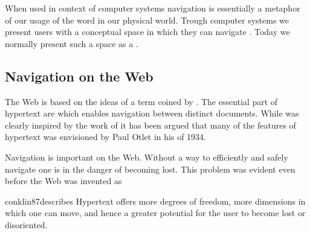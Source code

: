 When used in context of
computer systems navigation is essentially a metaphor of our usage of the
word in our physical world. Trough computer systems we present users with a
conceptual space in which they can navigate \citep[]{whiteside85}.
Today we normally present such a space as a %
.

\subsection{Navigation on the Web}
\label{section:background.navigation.navigation.on.the.web}

The Web is based on the ideas of \dash{}a term coined by
\citet[]{nelson65}. The essential part of hypertext are
 \citep[]{nelson65} which enables navigation between
distinct documents. While \citeauthor{nelson65} was clearly
inspired by the work of \citet{bush45} it has been argued \citep{rayward94}
that many of the features of hypertext was envisioned by Paul Otlet in his
 of 1934.

Navigation is important on the Web. Without a way to efficiently and safely
navigate one is in the danger of becoming lost. This problem was evident even
before the Web was invented as
\begin{fullquote}[\p{38}]{conklin87}{describes}
  Hypertext offers more degrees of freedom, more dimensions in which one
  can move, and hence a greater potential for the user
  to become lost or disoriented.
\end{fullquote}

